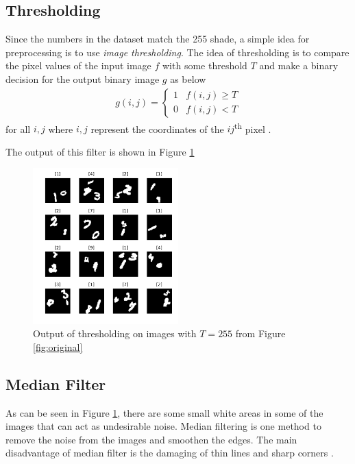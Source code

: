 \documentclass[letterpaper, 10 pt, conference]{ieeeconf}  %
\begin{document}
\subsection{Thresholding} 
Since the numbers in the dataset match the 255 shade, a simple idea for preprocessing is to use \textit{image thresholding}. 
The idea of thresholding is to compare the pixel values of the input image $f$ with some threshold $T$ and make a binary decision for the output binary image $g$ as below
\begin{align}
g(i,j) = \begin{cases}
1 & f(i,j)\ge T\\
0 & f(i,j)< T
\end{cases}
\end{align}
for all $i, j$ where $i, j$ represent the coordinates of the $ij$\textsuperscript{th} pixel \cite{bovik2009essential}.

The output of this filter is shown in Figure \ref{fig:thresholded}

\begin{figure}[h]
	\begin{center}
		\includegraphics[width=0.5\textwidth]{figures/thresholdDataset.pdf}  %
		\caption{Output of thresholding on images with $T=255$ from Figure \ref{fig:original}}
		\label{fig:thresholded}
	\end{center}
\end{figure}

\subsection{Median Filter}
As can be seen in Figure \ref{fig:thresholded}, there are some small white areas in some of the images that can act as undesirable noise. Median filtering is one method to remove the noise from the images and smoothen the edges. The main disadvantage of median filter is the damaging of thin lines and sharp corners \cite{bovik2009essential}. 
\end{document}
